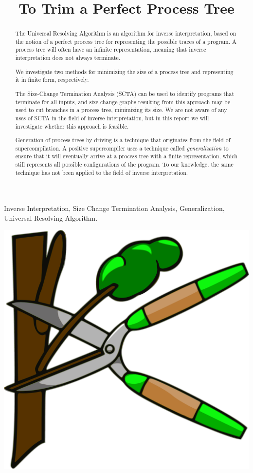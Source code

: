 \documentclass[10pt]{../sigplanconf}
\title{To Trim a Perfect Process Tree}
\begin{document}
\maketitle

\begin{abstract}
  The Universal Resolving Algorithm\cite{abramov2000universal} is an
  algorithm for inverse interpretation, based on the notion of a
  perfect process tree for representing the possible traces of a
  program. A process tree will often have an infinite representation,
  meaning that inverse interpretation does not always terminate.

  We investigate two methods for minimizing the size of a process tree
  and representing it in finite form, respectively.

  The Size-Change Termination Analysis (SCTA)\cite{lee2001size} can be
  used to identify programs that terminate for all inputs, and
  size-change graphs resulting from this approach may be used to cut
  branches in a process tree, minimizing its size. We are not aware of
  any uses of SCTA in the field of inverse interpretation, but in this
  report we will investigate whether this approach is feasible.

  Generation of process trees by driving is a technique that
  originates from the field of
  supercompilation\cite{sorensen1998introduction}. A positive
  supercompiler uses a technique called \emph{generalization} to
  ensure that it will eventually arrive at a process tree with a
  finite representation, which still represents all possible
  configurations of the program. To our knowledge, the same technique
  has not been applied to the field of inverse interpretation.
\end{abstract}

\keywords Inverse Interpretation, Size Change Termination Analysis,
Generalization, Universal Resolving Algorithm.
\begin{center}
  \vspace{0.5cm}
  \includegraphics[width=0.6\columnwidth]{../figures/pruning.pdf}
  \vspace{0.5cm}
\end{center}
\end{document}
